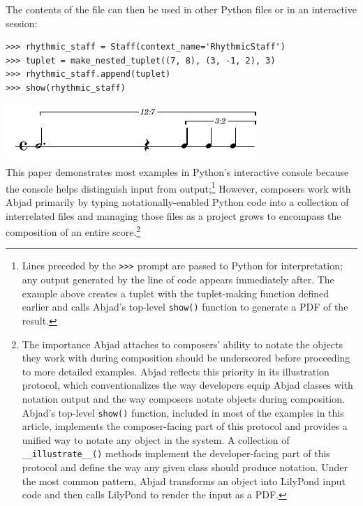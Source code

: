 \documentclass{article}
\begin{document}
\noindent The contents of the file can then be used in other Python files or in an interactive session:

\begin{lstlisting}
>>> rhythmic_staff = Staff(context_name='RhythmicStaff')
>>> tuplet = make_nested_tuplet((7, 8), (3, -1, 2), 3)
>>> rhythmic_staff.append(tuplet)
>>> show(rhythmic_staff)
\end{lstlisting}
\includegraphics{assets/lilypond-a8fcfb8f401a81a10afeb01a4f9f03ab.pdf}

\noindent This paper demonstrates most examples in Python's interactive console because the console helps distinguish input from output;\footnote{Lines preceded by the \texttt{>>>} prompt are passed to Python for interpretation; any output generated by the line of code appears immediately after. The example above creates a tuplet with the tuplet-making function defined earlier and calls Abjad's top-level \texttt{show()} function to generate a PDF of the result.} However, composers work with Abjad primarily by typing notationally-enabled Python code into a collection of interrelated files and managing those files as a project grows to encompass the composition of an entire score.\footnote{The importance Abjad attaches to composers' ability to notate the objects they work with during composition should be underscored before proceeding to more detailed examples. Abjad reflects this priority in its illustration protocol, which conventionalizes the way developers equip Abjad classes with
notation output and the way composers notate objects during
composition. Abjad's top-level \texttt{show()} function, included in most of the examples in this article, implements the composer-facing part of this protocol and provides a unified way to
notate any object in the system. A collection of \texttt{\_\_illustrate\_\_()} methods implement the developer-facing part of this protocol and define the way any given class should produce notation. Under the most common pattern, Abjad transforms an object into LilyPond input code and
then calls LilyPond to render the input as a PDF.}
\end{document}
